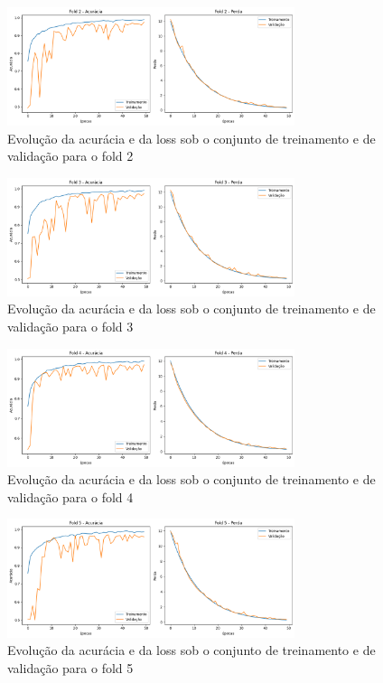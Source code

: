\documentclass[]{abntex2}
\begin{document}
\begin{figure}[H]
    \centering 
    \includegraphics[width=0.75\textwidth]{imgs/ex2/train_f2.png}
    \caption{Evolução da acurácia e da loss sob o conjunto de treinamento e de validação para o fold 2}
    \label{fig:t2} %
\end{figure}

\begin{figure}[H]
    \centering 
    \includegraphics[width=0.75\textwidth]{imgs/ex2/train_f3.png}
    \caption{Evolução da acurácia e da loss sob o conjunto de treinamento e de validação para o fold 3}
    \label{fig:t3} %
\end{figure}

\begin{figure}[H]
    \centering 
    \includegraphics[width=0.75\textwidth]{imgs/ex2/train_f4.png}
    \caption{Evolução da acurácia e da loss sob o conjunto de treinamento e de validação para o fold 4}
    \label{fig:t4} %
\end{figure}

\begin{figure}[H]
    \centering 
    \includegraphics[width=0.75\textwidth]{imgs/ex2/train_f5.png}
    \caption{Evolução da acurácia e da loss sob o conjunto de treinamento e de validação para o fold 5}
    \label{fig:t5} %
\end{figure}
\end{document}
